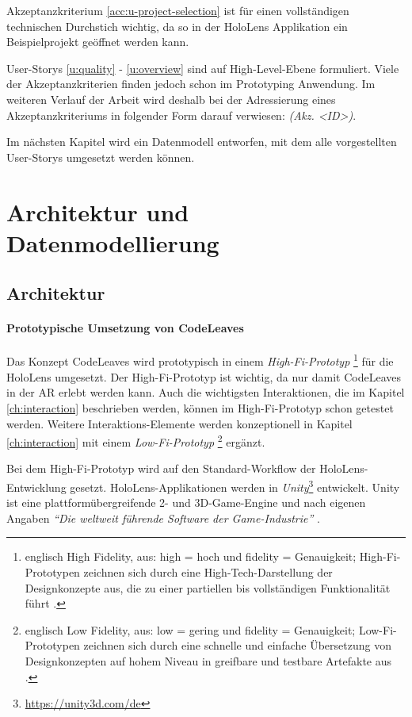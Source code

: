 Akzeptanzkriterium \ref{acc:u-project-selection} ist für einen vollständigen technischen Durchstich wichtig, da so in der HoloLens Applikation ein Beispielprojekt geöffnet werden kann.

User-Storys \ref{u:quality} - \ref{u:overview} sind auf High-Level-Ebene formuliert. Viele der Akzeptanzkriterien finden jedoch schon im Prototyping Anwendung. Im weiteren Verlauf der Arbeit wird deshalb bei der Adressierung eines Akzeptanzkriteriums in folgender Form darauf verwiesen: \textit{(Akz. <ID>)}.

Im nächsten Kapitel wird ein Datenmodell entworfen, mit dem alle vorgestellten User-Storys umgesetzt werden können.

\chapter{Architektur und Datenmodellierung}
\label{ch:data-model}
\section{Architektur}
\label{ch:data-layers}

\subsubsection*{Prototypische Umsetzung von CodeLeaves}

Das Konzept CodeLeaves wird prototypisch in einem \textit{High-Fi-Prototyp}
\footnote{englisch High Fidelity, aus: high = hoch und fidelity = Genauigkeit; High-Fi-Prototypen zeichnen sich durch eine High-Tech-Darstellung der Designkonzepte aus, die zu einer partiellen bis vollständigen Funktionalität führt \cite{egger2000fi}.} 
für die HoloLens umgesetzt. Der High-Fi-Prototyp ist wichtig, da nur damit CodeLeaves in der AR erlebt werden kann. Auch die wichtigsten Interaktionen, die im Kapitel \ref{ch:interaction} beschrieben werden, können im High-Fi-Prototyp schon getestet werden. Weitere Interaktions-Elemente werden konzeptionell in Kapitel \ref{ch:interaction} mit einem \textit{Low-Fi-Prototyp}
\footnote{englisch Low Fidelity, aus: low = gering und fidelity = Genauigkeit; Low-Fi-Prototypen zeichnen sich durch eine schnelle und einfache Übersetzung von Designkonzepten auf hohem Niveau in greifbare und testbare Artefakte aus \cite{egger2000fi}.}
ergänzt.

Bei dem High-Fi-Prototyp wird auf den Standard-Workflow der HoloLens-Entwicklung gesetzt. HoloLens-Applikationen werden in \textit{Unity}\footnote{\url{https://unity3d.com/de}} entwickelt. Unity ist eine platt\-form\-über\-grei\-fen\-de 2- und 3D-Game-Engine und nach eigenen Angaben \textit{"`Die weltweit führende Software der Game-Industrie"'} \cite{unity2017public}.

